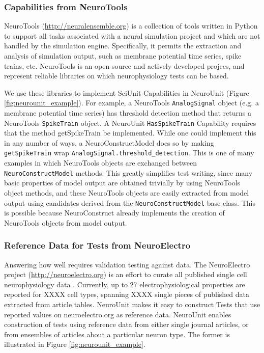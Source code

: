 \documentclass[a4paper,12pt]{article}
\begin{document}
\subsubsection{Capabilities from NeuroTools}
NeuroTools (\url{http://neuralensemble.org}) is a collection of tools written in Python to support all tasks associated with a neural simulation project and which are not handled by the simulation engine.  Specifically, it permits the extraction and analysis of simulation output, such as membrane potential time series, spike trains, etc. NeuroTools is an open source and actively developed projecs, and represent reliable libraries on which neurophysiology tests can be based. 

We use these libraries to implement SciUnit Capabilities in NeuroUnit (Figure \ref{fig:neurounit_example}).  For example, a NeuroTools \verb|AnalogSignal| object (e.g. a membrane potential time series) has threshold detection method that returns a NeuroTools \verb|SpikeTrain| object.  A NeuroUnit \verb|HasSpikeTrain| Capability requires that the method getSpikeTrain be implemented.  While one could implement this in any number of ways, a NeuroConstructModel does so by making \verb|getSpikeTrain| wrap \verb|AnalogSignal.threshold_detection|.  This is one of many examples in which NeuroTools objects are exchanged between \verb|NeuroConstructModel| methods.  This greatly simplifies test writing, since many basic properties of model output are obtained trivially by using NeuroTools object methods, and these NeuroTools objects are easily extracted from model output using candidates derived from the \verb|NeuroConstructModel| base class.  This is possible because NeuroConstruct already implements the creation of NeuroTools objects from model output.  

\subsubsection{Reference Data for Tests from NeuroElectro}
Answering how well requires validation testing against data. The NeuroElectro project (\url{http://neuroelectro.org}) is an effort to curate all published single cell neurophysiology data \cite{tripathy2012}.  Currently, up to 27 electrophysiological properties are reported for XXXX cell types, spanning XXXX single pieces of published data extracted from article tables.  NeuroUnit makes it easy to construct Tests that use reported values on neuroelectro.org as reference data.  NeuroUnit enables construction of tests using reference data from either single journal articles, or from ensembles of articles about a particular neuron type.  The former is illustrated in Figure \ref{fig:neurounit_example}.  
\end{document}

